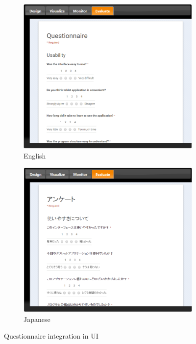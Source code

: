 \begin{figure}[H]
\centering
\begin{subfigure}[t]{0.48\textwidth}
\includegraphics[width=\textwidth]{../thesis/assets/questionnaire_integration.png}
\caption[English]{English}
\label{fig:ui_evaluate_en}
\end{subfigure}
\begin{subfigure}[t]{0.48\textwidth}
\includegraphics[width=\textwidth]{../thesis/assets/questionnaire_integration_jp.png}
\caption[Japanese]{Japanese}
\label{fig:ui_evaluate_jp}
\end{subfigure}
\caption[Questionnaire integration in UI]{Questionnaire integration in UI}
\label{fig:ui_evaluate}
\end{figure}

